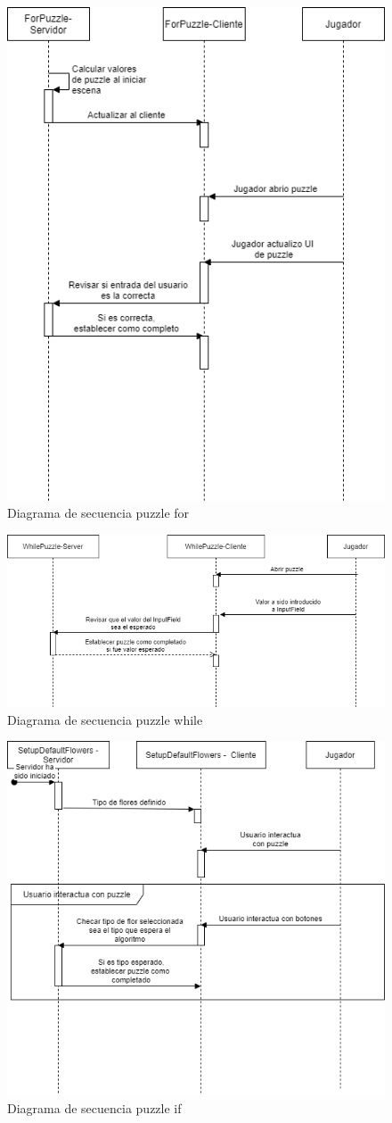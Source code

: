         \begin{figure}[H]
        \centering
        \includegraphics[width=0.4\linewidth]{images/DiagramaSecuenciaPuzzleFor.png}
        \caption{Diagrama de secuencia puzzle for}
        \label{fig:diagrama_sec_for}
    \end{figure}
        \begin{figure}[H]
        \centering
        \includegraphics[width=0.8\linewidth]{images/DiagramaSecuenciaPuzzleWhile.png}
        \caption{Diagrama de secuencia puzzle while}
        \label{fig:diagrama_sec_while}
    \end{figure}
        \begin{figure}[H]
        \centering
        \includegraphics[width=0.8\linewidth]{images/DiagramaSecuenciaPuzzleIf.png}
        \caption{Diagrama de secuencia puzzle if}
        \label{fig:diagrama_sec_if}
    \end{figure}
